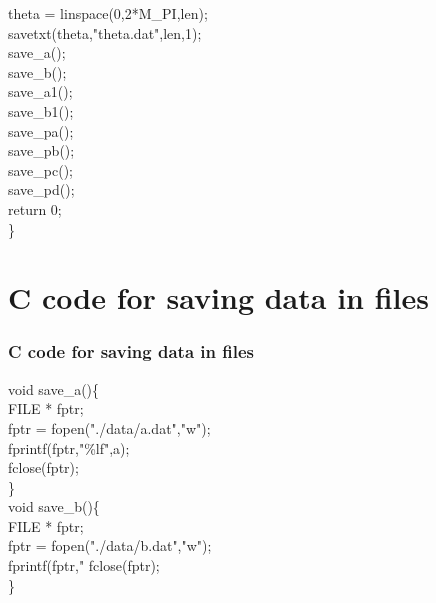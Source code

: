 \documentclass{beamer}
\theoremstyle{remark}
\numberwithin{equation}{section}
\begin{document}
\begin{frame}[t]

theta = linspace(0,2*M\_PI,len);\\
savetxt(theta,"theta.dat",len,1);\\
\vspace{10pt}
save\_a();\\
save\_b();\\
save\_a1();\\
save\_b1();\\
save\_pa();\\
save\_pb();\\
save\_pc();\\
save\_pd();\\
\vspace{20pt}
return 0;\\
\}\\
\end{frame}
\section{C code for saving data in files}
\begin{frame}[t]
\frametitle{C code for saving data in files}
\vspace{20pt}
void save\_a()\{\\
    FILE * fptr;\\
    fptr = fopen("./data/a.dat","w");\\
    fprintf(fptr,"\%lf",a);\\
    fclose(fptr);\\
\}\\
\vspace{12pt}
void save\_b()\{\\
    FILE * fptr;\\
    fptr = fopen("./data/b.dat","w");\\
    fprintf(fptr,"%
    fclose(fptr);\\
\}\\
\vspace{12pt}

\end{frame}
\end{document}
